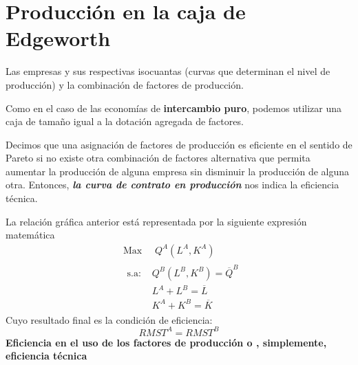 \section[Producción]{Producción en la caja de Edgeworth}

\begin{frame}
	Las empresas y sus respectivas isocuantas (curvas que determinan el nivel de producción) y la combinación de factores de producción.
		\begin{center}
				\vspace{3cm}
			\hspace{-11cm} 
		\end{center}
	Como en el caso de las economías de \textbf{intercambio puro}, podemos utilizar una caja de
	tamaño igual a la dotación agregada de factores.
\end{frame}
\begin{frame}
	Decimos que una asignación de factores de producción es eficiente en el sentido de Pareto si no existe otra combinación de factores alternativa que permita aumentar la producción de alguna empresa sin disminuir la producción de alguna otra. Entonces,  \textbf{\emph{la curva de contrato en producción}} nos indica la eficiencia técnica.
		\begin{center}
				\vspace{-0.7cm}
			 
		\end{center}
\end{frame}
\begin{frame}
	La relación gráfica anterior está representada por la siguiente expresión matemática
		\begin{align*}
			& \text{Max } \quad Q^{A}\left(L^{A},K^{A}\right) \\
			& \begin{array}{ll}
				\text{s.a: } & Q^{B}\left(L^{B},K^{B} \right) = \overline{Q}^{B}\\
							 & L^{A}+L^{B} = \overline{L}  \\
							 & K^{A}+K^{B} = \overline{K}  
			\end{array}
		\end{align*}
	Cuyo resultado final es la condición de eficiencia:
		$$RMST^A = RMST^B$$
	\textbf{Eficiencia en el uso de los factores de producción o , simplemente, eficiencia técnica}
\end{frame}
